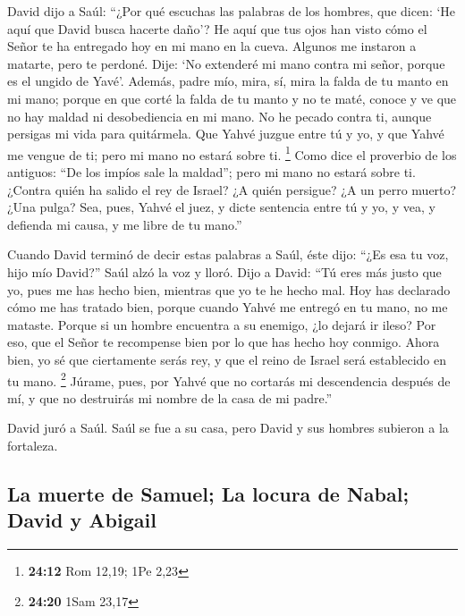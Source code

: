  David dijo a Saúl: ``¿Por qué escuchas las palabras de
los hombres, que dicen: `He aquí que David busca hacerte daño'?
 He aquí que tus ojos han visto cómo el Señor te ha
entregado hoy en mi mano en la cueva. Algunos me instaron a matarte,
pero te perdoné. Dije: `No extenderé mi mano contra mi señor, porque es
el ungido de Yavé'.  Además, padre mío, mira, sí, mira la
falda de tu manto en mi mano; porque en que corté la falda de tu manto y
no te maté, conoce y ve que no hay maldad ni desobediencia en mi mano.
No he pecado contra ti, aunque persigas mi vida para quitármela.
 Que Yahvé juzgue entre tú y yo, y que Yahvé me vengue de
ti; pero mi mano no estará sobre ti. \footnote{\textbf{24:12} Rom 12,19;
  1Pe 2,23}  Como dice el proverbio de los antiguos: ``De
los impíos sale la maldad''; pero mi mano no estará sobre ti.
 ¿Contra quién ha salido el rey de Israel? ¿A quién
persigue? ¿A un perro muerto? ¿Una pulga?  Sea, pues,
Yahvé el juez, y dicte sentencia entre tú y yo, y vea, y defienda mi
causa, y me libre de tu mano.''

 Cuando David terminó de decir estas palabras a Saúl,
éste dijo: ``¿Es esa tu voz, hijo mío David?'' Saúl alzó la voz y lloró.
 Dijo a David: ``Tú eres más justo que yo, pues me has
hecho bien, mientras que yo te he hecho mal.  Hoy has
declarado cómo me has tratado bien, porque cuando Yahvé me entregó en tu
mano, no me mataste.  Porque si un hombre encuentra a su
enemigo, ¿lo dejará ir ileso? Por eso, que el Señor te recompense bien
por lo que has hecho hoy conmigo.  Ahora bien, yo sé que
ciertamente serás rey, y que el reino de Israel será establecido en tu
mano. \footnote{\textbf{24:20} 1Sam 23,17}  Júrame, pues,
por Yahvé que no cortarás mi descendencia después de mí, y que no
destruirás mi nombre de la casa de mi padre.''

 David juró a Saúl. Saúl se fue a su casa, pero David y
sus hombres subieron a la fortaleza.

\hypertarget{la-muerte-de-samuel-la-locura-de-nabal-david-y-abigail}{%
\subsection{La muerte de Samuel; La locura de Nabal; David y
Abigail}\label{la-muerte-de-samuel-la-locura-de-nabal-david-y-abigail}}

